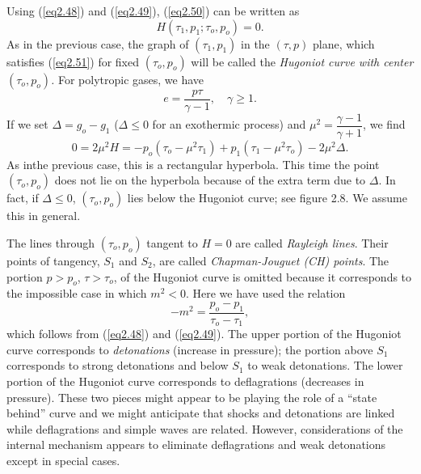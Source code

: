 Using (\ref{eq2.48}) and (\ref{eq2.49}), (\ref{eq2.50}) can be written as
\begin{equation*}
H(\tau_1, p_1 ; \tau_o , p_o) = 0.\tag{2.51}\label{eq2.51}
\end{equation*}
As in the previous case, the graph of $(\tau_1, p_1)$ in the $(\tau, p)$ plane, which satisfies (\ref{eq2.51}) for fixed $(\tau_o, p_o)$ will be called the {\em Hugoniot curve with center $(\tau_o, p_o)$.} For polytropic gases, we have
$$
e = \frac{p\tau}{\gamma -1}, \quad \gamma \geq 1.
$$
If we set $\Delta =g_o - g_1$ ($\Delta \leq 0$ for an exothermic process) and $\mu^2 = \dfrac{\gamma -1}{\gamma +1}$, we find 
\begin{equation*}
0 = 2\mu^2 H = -p_o (\tau_o - \mu^2 \tau_1) + p_1 (\tau_1 - \mu^2 \tau_o) - 2 \mu^2 \Delta . \tag{2.52}\label{eq2.52}
\end{equation*}
As in\pageoriginale the previous case, this is a rectangular hyperbola. This time the point $(\tau_o, p_o)$ does not lie on the hyperbola because of the extra term due to $\Delta$. In fact, if $\Delta \leq 0$, $(\tau_o, p_o)$ lies below the Hugoniot curve; see figure 2.8. We assume this in general.

The lines through $(\tau_o, p_o)$ tangent to $H=0$ are called {\em Rayleigh lines}. Their points of tangency, $S_1$ and $S_2$, are called {\em Chapman-Jouguet (CH) points}. The portion $p> p_o$, $\tau > \tau_o$, of the Hugoniot curve is omitted because it corresponds to the impossible case in which $m^2 < 0$. Here we have used the relation
$$
-m^2 = \frac{p_o - p_1}{\tau_o - \tau_1},
$$
which follows from (\ref{eq2.48}) and (\ref{eq2.49}). The upper portion of the Hugoniot curve corresponds to {\em detonations} (increase in pressure); the portion above $S_1$ corresponds to strong detonations and below $S_1$ to weak detonations. The lower portion of the Hugoniot curve corresponds to deflagrations (decreases in pressure). These two pieces might appear to be playing the role of a ``state behind'' curve and we might anticipate that shocks and detonations are linked while deflagrations and simple waves are related. However, considerations of the internal mechanism appears to eliminate deflagrations and weak detonations except in special cases.

